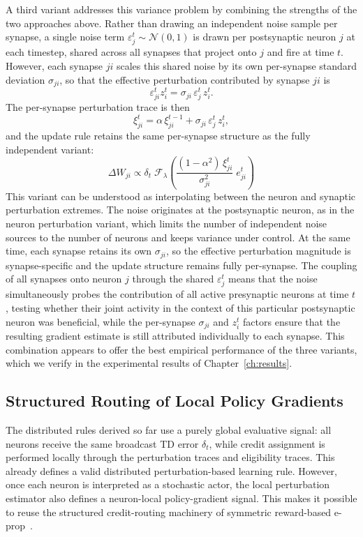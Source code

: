     A third variant addresses this variance problem by combining the strengths of the two
    approaches above. Rather than drawing an independent noise sample per synapse, a single
    noise term $\varepsilon_j^t \sim \mathcal{N}(0, 1)$ is drawn per postsynaptic neuron
    $j$ at each timestep, shared across all synapses that project onto $j$ and fire at time
    $t$. However, each synapse $ji$ scales this shared noise by its own per-synapse standard
    deviation $\sigma_{ji}$, so that the effective perturbation contributed by synapse $ji$
    is
    \[
        \varepsilon_{ji}^t z_i^t = \sigma_{ji}\, \varepsilon_j^t\, z_i^t.
    \]
    The per-synapse perturbation trace is then
    \[
        \xi_{ji}^t = \alpha\, \xi_{ji}^{t-1} + \sigma_{ji}\, \varepsilon_j^t\, z_i^t,
    \]
    and the update rule retains the same per-synapse structure as the fully independent
    variant:
    \[
        \Delta W_{ji}
        \propto
        \delta_t\;
        \mathcal{F}_{\lambda}
        \!\left(
            \frac{(1 - \alpha^2)\, \xi_{ji}^t}{\sigma_{ji}^2}\;
            e_{ji}^t
        \right)
    \]
    This variant can be understood as interpolating between the neuron and synaptic
    perturbation extremes. The noise originates at the postsynaptic neuron, as in the
    neuron perturbation variant, which limits the number of independent noise sources to
    the number of neurons and keeps variance under control. At the same time, each synapse
    retains its own $\sigma_{ji}$, so the effective perturbation magnitude is synapse-specific
    and the update structure remains fully per-synapse. The coupling of all synapses onto
    neuron $j$ through the shared $\varepsilon_j^t$ means that the noise simultaneously
    probes the contribution of all active presynaptic neurons at time $t$, testing whether
    their joint activity in the context of this particular postsynaptic neuron was
    beneficial, while the per-synapse $\sigma_{ji}$ and $z_i^t$ factors ensure that the
    resulting gradient estimate is still attributed individually to each synapse. This
    combination appears to offer the best empirical performance of the three variants, which
    we verify in the experimental results of Chapter~\ref{ch:results}.
    
    \subsection{Structured Routing of Local Policy Gradients}
    \label{subsec:structured_routing}
    
    The distributed rules derived so far use a purely global evaluative signal:
    all neurons receive the same broadcast TD error $\delta_t$, while credit
    assignment is performed locally through the perturbation traces and
    eligibility traces.
    This already defines a valid distributed perturbation-based learning rule.
    However, once each neuron is interpreted as a stochastic actor, the local
    perturbation estimator also defines a neuron-local policy-gradient signal.
    This makes it possible to reuse the structured credit-routing machinery of
    symmetric reward-based e-prop~\cite{eprop2020}.
    
